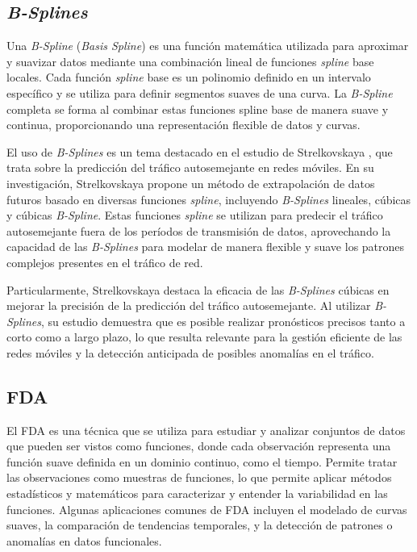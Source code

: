 \subsection{\textit{B-Splines}} %
Una \textit{B-Spline} (\textit{Basis Spline}) es una función matemática utilizada para aproximar y suavizar datos mediante una combinación lineal de funciones \textit{spline} base locales. Cada función \textit{spline} base es un polinomio definido en un intervalo específico y se utiliza para definir segmentos suaves de una curva. La \textit{B-Spline} completa se forma al combinar estas funciones spline base de manera suave y continua, proporcionando una representación flexible de datos y curvas.

El uso de \textit{B-Splines} es un tema destacado en el estudio de Strelkovskaya \cite{strelkovskaya2019}, que trata sobre la predicción del tráfico autosemejante en redes móviles.
En su investigación, Strelkovskaya propone un método de extrapolación de datos futuros basado en diversas funciones \textit{spline}, incluyendo \textit{B-Splines} lineales, cúbicas y cúbicas \textit{B-Spline}. Estas funciones \textit{spline} se utilizan para predecir el tráfico autosemejante fuera de los períodos de transmisión de datos, aprovechando la capacidad de las \textit{B-Splines} para modelar de manera flexible y suave los patrones complejos presentes en el tráfico de red.

Particularmente, Strelkovskaya destaca la eficacia de las \textit{B-Splines} cúbicas en mejorar la precisión de la predicción del tráfico autosemejante. Al utilizar \textit{B-Splines}, su estudio demuestra que es posible realizar pronósticos precisos tanto a corto como a largo plazo, lo que resulta relevante para la gestión eficiente de las redes móviles y la detección anticipada de posibles anomalías en el tráfico.

\subsection{FDA} %
El \ac{FDA} es una técnica que se utiliza para estudiar y analizar conjuntos de datos que pueden ser vistos como funciones, donde cada observación representa una función suave definida en un dominio continuo, como el tiempo.
Permite tratar las observaciones como muestras de funciones, lo que permite aplicar métodos estadísticos y matemáticos para caracterizar y entender la variabilidad en las funciones. Algunas aplicaciones comunes de FDA incluyen el modelado de curvas suaves, la comparación de tendencias temporales, y la detección de patrones o anomalías en datos funcionales.

